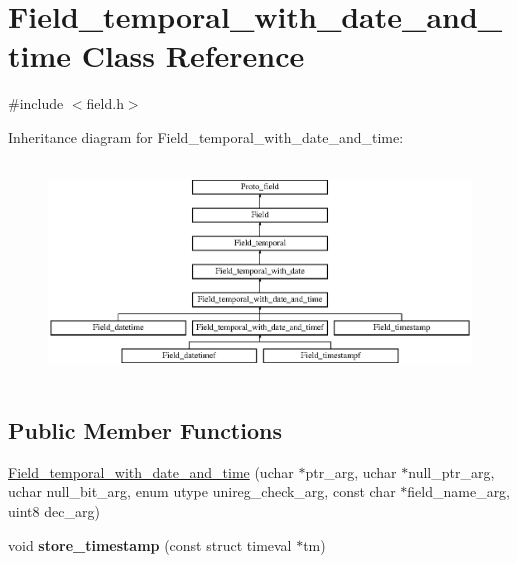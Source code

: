 \hypertarget{classField__temporal__with__date__and__time}{}\section{Field\+\_\+temporal\+\_\+with\+\_\+date\+\_\+and\+\_\+time Class Reference}
\label{classField__temporal__with__date__and__time}


{\ttfamily \#include $<$field.\+h$>$}

Inheritance diagram for Field\+\_\+temporal\+\_\+with\+\_\+date\+\_\+and\+\_\+time\+:\begin{figure}[H]
\begin{center}
\leavevmode
\includegraphics[height=5.833333cm]{classField__temporal__with__date__and__time}
\end{center}
\end{figure}
\subsection*{Public Member Functions}
\begin{DoxyCompactItemize}
\item 
\mbox{\hyperlink{classField__temporal__with__date__and__time_a60d02d91b14a2b46453e749156f42486}{Field\+\_\+temporal\+\_\+with\+\_\+date\+\_\+and\+\_\+time}} (uchar $\ast$ptr\+\_\+arg, uchar $\ast$null\+\_\+ptr\+\_\+arg, uchar null\+\_\+bit\+\_\+arg, enum utype unireg\+\_\+check\+\_\+arg, const char $\ast$field\+\_\+name\+\_\+arg, uint8 dec\+\_\+arg)
\item 
\mbox{\label{classField__temporal__with__date__and__time_ad2f6c6b5db8898a26803988822f18549}} 
void {\bfseries store\+\_\+timestamp} (const struct timeval $\ast$tm)
\end{DoxyCompactItemize}
